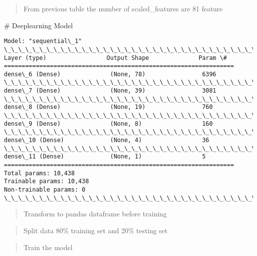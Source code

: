\documentclass[11pt]{article}
\begin{document}
    \begin{quote}
From previous table the number of scaled\_features are 81 feature
\end{quote}

    \# Deeplearning Model

    \begin{Verbatim}[commandchars=\\\{\}]
Model: "sequential\_1"
\_\_\_\_\_\_\_\_\_\_\_\_\_\_\_\_\_\_\_\_\_\_\_\_\_\_\_\_\_\_\_\_\_\_\_\_\_\_\_\_\_\_\_\_\_\_\_\_\_\_\_\_\_\_\_\_\_\_\_\_\_\_\_\_\_
Layer (type)                 Output Shape              Param \#
=================================================================
dense\_6 (Dense)              (None, 78)                6396
\_\_\_\_\_\_\_\_\_\_\_\_\_\_\_\_\_\_\_\_\_\_\_\_\_\_\_\_\_\_\_\_\_\_\_\_\_\_\_\_\_\_\_\_\_\_\_\_\_\_\_\_\_\_\_\_\_\_\_\_\_\_\_\_\_
dense\_7 (Dense)              (None, 39)                3081
\_\_\_\_\_\_\_\_\_\_\_\_\_\_\_\_\_\_\_\_\_\_\_\_\_\_\_\_\_\_\_\_\_\_\_\_\_\_\_\_\_\_\_\_\_\_\_\_\_\_\_\_\_\_\_\_\_\_\_\_\_\_\_\_\_
dense\_8 (Dense)              (None, 19)                760
\_\_\_\_\_\_\_\_\_\_\_\_\_\_\_\_\_\_\_\_\_\_\_\_\_\_\_\_\_\_\_\_\_\_\_\_\_\_\_\_\_\_\_\_\_\_\_\_\_\_\_\_\_\_\_\_\_\_\_\_\_\_\_\_\_
dense\_9 (Dense)              (None, 8)                 160
\_\_\_\_\_\_\_\_\_\_\_\_\_\_\_\_\_\_\_\_\_\_\_\_\_\_\_\_\_\_\_\_\_\_\_\_\_\_\_\_\_\_\_\_\_\_\_\_\_\_\_\_\_\_\_\_\_\_\_\_\_\_\_\_\_
dense\_10 (Dense)             (None, 4)                 36
\_\_\_\_\_\_\_\_\_\_\_\_\_\_\_\_\_\_\_\_\_\_\_\_\_\_\_\_\_\_\_\_\_\_\_\_\_\_\_\_\_\_\_\_\_\_\_\_\_\_\_\_\_\_\_\_\_\_\_\_\_\_\_\_\_
dense\_11 (Dense)             (None, 1)                 5
=================================================================
Total params: 10,438
Trainable params: 10,438
Non-trainable params: 0
\_\_\_\_\_\_\_\_\_\_\_\_\_\_\_\_\_\_\_\_\_\_\_\_\_\_\_\_\_\_\_\_\_\_\_\_\_\_\_\_\_\_\_\_\_\_\_\_\_\_\_\_\_\_\_\_\_\_\_\_\_\_\_\_\_
    \end{Verbatim}

    \begin{quote}
Transform to pandas dataframe before training
\end{quote}

    \begin{quote}
Split data 80\% training set and 20\% testing set
\end{quote}

    \begin{quote}
Train the model
\end{quote}
\end{document}
